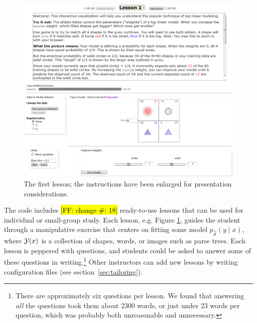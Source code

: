 \documentclass[11pt,letterpaper]{article}
\newcommand{\Note}[1]{}
\renewcommand{\Note}[1]{\hl{[#1]}}
\newcommand{\NoteSigned}[3]{{\sethlcolor{#2}\Note{#1: #3}}}
\newcommand{\NoteFF}[1]{\NoteSigned{FF}{LightBlue}{#1}}
\newcommand{\NoteJE}[1]{\NoteSigned{JE}{LightGreen}{#1}}
\newcommand{\Commented}[1]{}
\newcommand{\NumLessons}[0]{\NoteFF{change \#: 18}}
\begin{document}
\begin{figure}
\centering
\includegraphics[scale=.49]{images/lesson1-051313-intro-zoom-instmore.PNG}
\caption{The first lesson; the instructions 
have been enlarged for presentation considerations.}
\label{fig:lesson1}
\end{figure}


The code includes \NumLessons{} ready-to-use lessons that can be used
for individual or small-group study.  Each lesson, e.g. Figure \ref{fig:lesson1}, guides the student
through a manipulative exercise that centers on fitting some model
$p_{\vec{\theta}}(y \mid x)$, where ${\cal Y}(x)$ is a collection of
shapes, words, or images such as parse trees.  Each lesson is peppered
with questions, and students could be asked to answer some of these
questions in writing.\footnote{There are approximately six questions per
lesson. We found that answering {\em all} the
  questions took them about 2300 words, or just under 23 words per question, which
  was probably both unreasonable and unnecessary.}
\Commented{\NoteJE{We might
  consider releasing a couple of pencil-and-paper problems from past
  exams.}}  Other instructors can add new lessons by writing 
configuration files (see section~\ref{sec:tailoring}).

\Commented{\NoteJE{However, I
  think it would be helpful (maybe in the final version?) to list
  other people's NLP homework assignments or practical exercises that
  use maxent.  I bet you could find a few good assignments on the web,
  including in the NLTK book.}}
\end{document}
